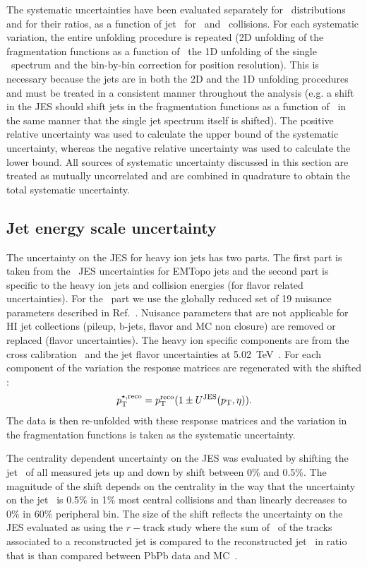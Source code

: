 The systematic uncertainties have been evaluated separately for \Dptr\ distributions and for their ratios, as a function of jet \pT\ for \pp\ and \pbpb\ collisions. For each systematic variation, the entire unfolding procedure is repeated (2D unfolding of the fragmentation
functions as a function of \ptjet\, the 1D unfolding of the single \ptjet\ spectrum and the bin-by-bin correction for position resolution). This is necessary because the jets are in both the 2D and the 1D unfolding procedures and must be treated in a consistent manner throughout the analysis (e.g. a shift in the JES should 
shift jets in the fragmentation functions as a function of \ptjet\ in the same manner
that the single jet spectrum itself is shifted).
The positive relative uncertainty was used to calculate the upper bound of the systematic uncertainty, whereas the negative relative uncertainty was used to calculate the lower bound. All sources of systematic uncertainty discussed in this section are treated as mutually uncorrelated and are combined in quadrature to obtain the total systematic uncertainty. 

\subsection{Jet energy scale uncertainty}

The uncertainty on the JES for heavy ion jets has two parts.  The first part is taken from
the \pp\ JES uncertainties for EMTopo jets and the second part is specific to the heavy ion jets
and collision energies (for flavor related uncertainties).  For the \pp\ part we use the globally reduced
set of 19 nuisance parameters described in Ref.~\cite{JESuncertaintytwiki}. Nuisance parameters that are not applicable for HI jet collections (pileup, b-jets, flavor and MC non closure) are removed or replaced (flavor uncertainties). The heavy ion specific components are from the cross calibration~\cite{cc2015} and the jet
flavor uncertainties at 5.02~TeV~\cite{pPbIntNote}.  For each component of the variation
the response matrices are regenerated with the shifted \ptjet:
\begin{equation}
   \pT^{\star,\mathrm{reco}} = \pT^{\mathrm{reco}} (1\pm U^{\mathrm{JES}}(\pT , \eta)).
\end{equation}
The data is then re-unfolded with these response matrices and the variation in the fragmentation 
functions is taken as the systematic uncertainty.

 The centrality dependent uncertainty on the JES was evaluated by shifting the jet \pt\ of all measured jets up and down by shift between 0\% and 0.5\%. The magnitude of the shift depends on the centrality in the way that the uncertainty on the jet \pt\ is 0.5\% in 1\% most central collisions and than linearly decreases to 0\% in 60\% peripheral bin. The size of the shift reflects the uncertainty on the JES evaluated as using the $r-$track study where the sum of \pT\ of the tracks associated to a reconstructed jet is compared to the reconstructed jet \pT\ in ratio that is than compared between PbPb data and MC~\cite{HIjesnote,PbPbRaaNote}.

